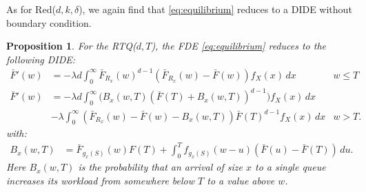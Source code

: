 \documentclass[12pt]{report}
\newtheorem{proposition}[theorem]{Proposition}
\begin{document}
As for Red($d,k,\delta$), we again find that \eqref{eq:equilibrium} reduces to a DIDE without boundary condition.
\begin{proposition}\label{prop:RTQ}
For the RTQ($d,T$), the FDE \eqref{eq:equilibrium} reduces to the following DIDE:
\begin{align}
\bar F'(w)
&= -\lambda d \int_0^\infty \bar F_{R_x}(w)^{d-1}(\bar F_{R_x}(w) - \bar F(w) ) f_{X}(x) \, dx & w \leq T\\
\bar F'(w)
&= -\lambda d \int_0^\infty \bigg( B_x(w,T) (\bar F(T) + B_x(w,T))^{d-1} \bigg) f_{X}(x) \, dx & \nonumber \\
& - \lambda \int_0^\infty (\bar F_{R_x}(w) - \bar F(w) - B_x(w,T)) \bar F(T)^{d-1} f_{X}(x) \, dx & w > T.
\end{align}
with:
\begin{align*}
B_x(w,T)&=\bar F_{g_x(S)}(w) F(T) + \int_0^T f_{g_x(S)}(w-u) (\bar F(u) - \bar F(T))\, du.
\end{align*}
Here $B_x(w,T)$ is the probability that an arrival of size $x$ to a single queue increases its workload from somewhere below $T$ to a value above $w$.
\end{proposition}
\end{document}

